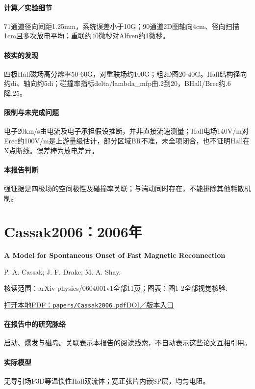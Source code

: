 \paragraph{计算／实验细节}71通道径向间距1.25mm，系统误差小于10G；90通道2D图轴向4cm、径向扫描1cm且多次放电平均；重联约40微秒对Alfven约1微秒。

\paragraph{核实的发现}四极Hall磁场高分辨率50-60G，对重联场约100G；粗2D图20-40G。Hall结构径向约di、轴向约5di；碰撞率指标delta/lambda\_mfp由.2到20，BHall/Brec约.6降.25。

\paragraph{限制与未完成问题}电子20km/s由电流及电子承担假设推断，并非直接流速测量；Hall电场140V/m对Erec约100V/m是上游量级估计，部分区域BR不准，未全项闭合，也不证明Hall在X点断线。误差棒为放电差异。

\paragraph{本报告判断}强证据是四极场的空间极性及碰撞率关联；与湍动同时存在，不能排除其他耗散机制。

\section{Cassak2006：2006年}\label{paper:Cassak2006}

\textbf{A Model for Spontaneous Onset of Fast Magnetic Reconnection}\citep{Cassak2006}\

P. A. Cassak;  J. F. Drake;  M. A. Shay.

\textsf{核读范围：}arXiv physics/0604001v1全部11页；\textsf{图表：}图1-2全部视觉核验.

\href{run:papers/Cassak2006.pdf}{打开本地PDF：\texttt{papers/Cassak2006.pdf}}\quad\href{https://doi.org/10.1086/505690}{DOI／版本入口}

\paragraph{在报告中的研究脉络}\hyperref[story:onset]{启动、爆发与磁岛}。关联表示本报告的阅读线索，不自动表示这些论文互相引用。

\paragraph{实际模型}无导引场F3D等温惯性Hall双流体；宽正弦片内嵌SP层，均匀电阻。

